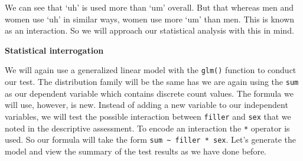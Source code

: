 \documentclass[
]{article}
\begin{document}
We can see that `uh' is used more than `um' overall. But that whereas men and women use `uh' in similar ways, women use more `um' than men. This is known as an interaction. So we will approach our statistical analysis with this in mind.

\textbf{Statistical interrogation}

We will again use a generalized linear model with the \texttt{glm()} function to conduct our test. The distribution family will be the same has we are again using the \texttt{sum} as our dependent variable which contains discrete count values. The formula we will use, however, is new. Instead of adding a new variable to our independent variables, we will test the possible interaction between \texttt{filler} and \texttt{sex} that we noted in the descriptive assessment. To encode an interaction the \texttt{*} operator is used. So our formula will take the form \texttt{sum\ \textasciitilde{}\ filler\ *\ sex}. Let's generate the model and view the summary of the test results as we have done before.
\end{document}
